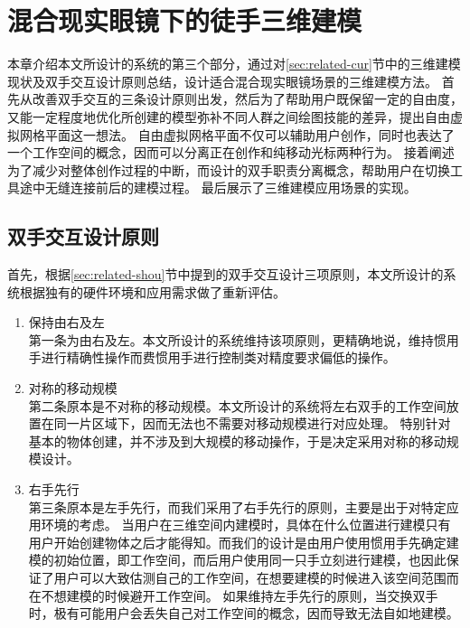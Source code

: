 
\chapter{混合现实眼镜下的徒手三维建模}
\label{chap:3DModel}
本章介绍本文所设计的系统的第三个部分，通过对\ref{sec:related-cur}节中的三维建模现状及双手交互设计原则总结，设计适合混合现实眼镜场景的三维建模方法。
首先从改善双手交互的三条设计原则出发，然后为了帮助用户既保留一定的自由度，又能一定程度地优化所创建的模型弥补不同人群之间绘图技能的差异，提出自由虚拟网格平面这一想法。
自由虚拟网格平面不仅可以辅助用户创作，同时也表达了一个工作空间的概念，因而可以分离正在创作和纯移动光标两种行为。
接着阐述为了减少对整体创作过程的中断，而设计的双手职责分离概念，帮助用户在切换工具途中无缝连接前后的建模过程。
最后展示了三维建模应用场景的实现。

\section{双手交互设计原则}

首先，根据\ref{sec:related-shou}节中提到的双手交互设计三项原则，本文所设计的系统根据独有的硬件环境和应用需求做了重新评估。

\begin{enumerate}
\item 保持由右及左 \hfill\\
第一条为由右及左。本文所设计的系统维持该项原则，更精确地说，维持惯用手进行精确性操作而费惯用手进行控制类对精度要求偏低的操作。

\item 对称的移动规模 \hfill\\
第二条原本是不对称的移动规模。本文所设计的系统将左右双手的工作空间放置在同一片区域下，因而无法也不需要对移动规模进行对应处理。
特别针对基本的物体创建，并不涉及到大规模的移动操作，于是决定采用对称的移动规模设计。

\item 右手先行 \hfill\\
第三条原本是左手先行，而我们采用了右手先行的原则，主要是出于对特定应用环境的考虑。
当用户在三维空间内建模时，具体在什么位置进行建模只有用户开始创建物体之后才能得知。而我们的设计是由用户使用惯用手先确定建模的初始位置，即工作空间，而后用户使用同一只手立刻进行建模，也因此保证了用户可以大致估测自己的工作空间，在想要建模的时候进入该空间范围而在不想建模的时候避开工作空间。
如果维持左手先行的原则，当交换双手时，极有可能用户会丢失自己对工作空间的概念，因而导致无法自如地建模。

\end{enumerate}
